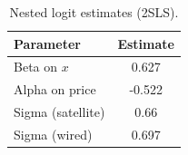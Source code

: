 \begin{table}[H]
\centering
\caption{Nested logit estimates (2SLS).}
\begin{tabular}{lc}
\toprule
Parameter & Estimate\\
\midrule
Beta on $x$ & 0.627\\
Alpha on price & -0.522\\
Sigma (satellite) & 0.66\\
Sigma (wired) & 0.697\\
\bottomrule
\end{tabular}
\end{table}
